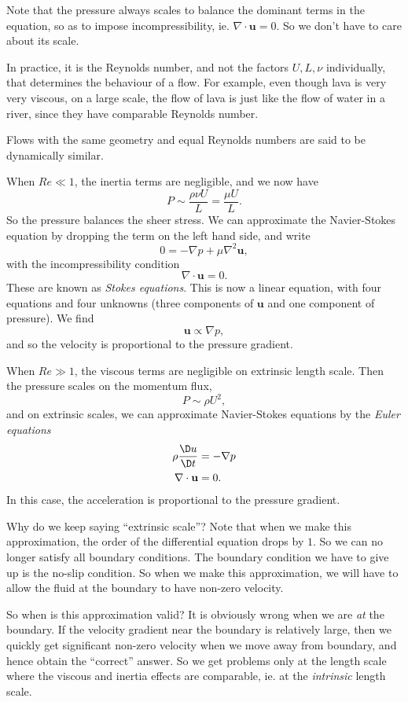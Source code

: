 \documentclass[a4paper]{article}
\begin{document}
Note that the pressure always scales to balance the dominant terms in the equation, so as to impose incompressibility, ie. $\nabla \cdot \mathbf{u} = 0$. So we don't have to care about its scale.

In practice, it is the Reynolds number, and not the factors $U, L, \nu$ individually, that determines the behaviour of a flow. For example, even though lava is very very viscous, on a large scale, the flow of lava is just like the flow of water in a river, since they have comparable Reynolds number.

\begin{defi}
  Flows with the same geometry and equal Reynolds numbers are said to be dynamically similar.
\end{defi}

When $Re \ll 1$, the inertia terms are negligible, and we now have
\[
  P \sim \frac{\rho\nu U}{L} = \frac{\mu U}{L}.
\]
So the pressure balances the sheer stress. We can approximate the Navier-Stokes equation by dropping the term on the left hand side, and write
\[
  0 = -\nabla p + \mu \nabla^2 \mathbf{u},
\]
with the incompressibility condition
\[
  \nabla \cdot \mathbf{u} = 0.
\]
These are known as \emph{Stokes equations}. This is now a linear equation, with four equations and four unknowns (three components of $\mathbf{u}$ and one component of pressure). We find
\[
  \mathbf{u} \propto \nabla p,
\]
and so the velocity is proportional to the pressure gradient.

When $Re \gg 1$, the viscous terms are negligible on extrinsic length scale. Then the pressure scales on the momentum flux,
\[
  P \sim \rho U^2,
\]
and on extrinsic scales, we can approximate Navier-Stokes equations by the \emph{Euler equations}
\begin{align*}
  \rho \frac{\D u}{\D t} &= - \nabla p\\
  \nabla \cdot \mathbf{u} &= 0.
\end{align*}
In this case, the acceleration is proportional to the pressure gradient.

Why do we keep saying ``extrinsic scale''? Note that when we make this approximation, the order of the differential equation drops by $1$. So we can no longer satisfy all boundary conditions. The boundary condition we have to give up is the no-slip condition. So when we make this approximation, we will have to allow the fluid at the boundary to have non-zero velocity.

So when is this approximation valid? It is obviously wrong when we are \emph{at} the boundary. If the velocity gradient near the boundary is relatively large, then we quickly get significant non-zero velocity when we move away from boundary, and hence obtain the ``correct'' answer. So we get problems only at the length scale where the viscous and inertia effects are comparable, ie. at the \emph{intrinsic} length scale.
\end{document}

